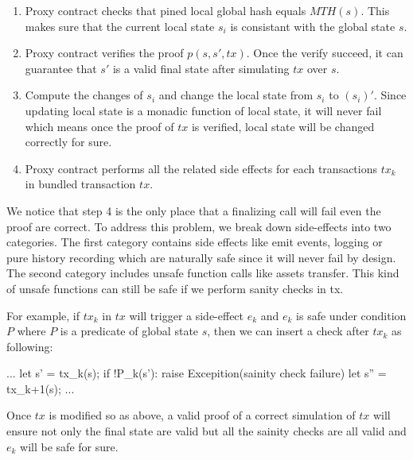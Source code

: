 \documentclass[pageno]{jpaper}
\newenvironment{code}%
   {\snugshade\verbatim}%
   {\endverbatim\endsnugshade}
\begin{document}
\begin{enumerate}[leftmargin=*]
\item Proxy contract checks that pined local global hash equals $MTH(s)$. This makes sure that the current local state $s_i$ is consistant with the global state $s$.

\item Proxy contract verifies the proof $p(s, s', tx)$. Once the verify succeed, it can guarantee that $s'$ is a valid final state after simulating $tx$ over $s$.

\item Compute the changes of $s_i$ and change the local state from $s_i$ to $(s_i)'$. Since updating local state is a monadic function of local state, it will never fail which means once the proof of $tx$ is verified, local state will be changed correctly for sure.

\item Proxy contract performs all the related side effects for each transactions $tx_k$ in bundled transaction $tx$. 
\end{enumerate}

We notice that step 4 is the only place that a finalizing call will fail even the proof are correct. To address this problem, we break down side-effects into two categories. The first category contains side effects like emit events, logging or pure history recording which are naturally safe since it will never fail by design. The second category includes unsafe function calls like assets transfer. This kind of unsafe functions can still be safe if we perform sanity checks in tx.

For example, if $tx_k$ in $tx$ will trigger a side-effect $e_k$ and $e_k$ is safe under condition $P$ where $P$ is a predicate of global state $s$, then we can insert a check after $tx_k$ as following:

\begin{code}
...
let s' = tx_k(s);
if !P_k(s'):
    raise Excepition(sainity check failure)
let s'' = tx_{k+1}(s);
...
\end{code}

Once $tx$ is modified so as above, a valid proof of a correct simulation of $tx$ will ensure not only the final state are valid but all the sainity checks are all valid and $e_k$ will be safe for sure.
\end{document}
